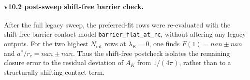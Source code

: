 \paragraph{v10.2 post-sweep shift-free barrier check.}
After the full legacy sweep, the preferred-fit rows were re-evaluated with the shift-free barrier contact model \texttt{barrier\_flat\_at\_rc}, without altering any legacy outputs. For the two highest $N_{\mathrm{int}}$ rows at $\lambda_K=0$, one finds $F(1) = nan \pm nan$ and $a^*/r_c = nan \pm nan$. Thus the shift-free postcheck isolates the remaining closure error to the residual deviation of $A_K$ from $1/(4\pi)$, rather than to a structurally shifting contact term.
